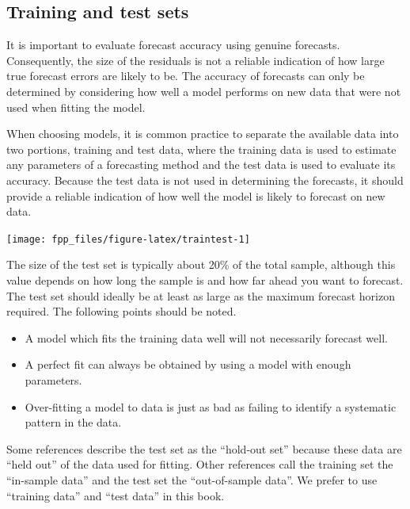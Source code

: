 \documentclass[]{book}
\providecommand{\tightlist}{%
  \setlength{\itemsep}{0pt}\setlength{\parskip}{0pt}}
\begin{document}
\hypertarget{training-and-test-sets}{%
\subsection*{Training and test sets}\label{training-and-test-sets}}

It is important to evaluate forecast accuracy using genuine forecasts. Consequently, the size of the residuals is not a reliable indication of how large true forecast errors are likely to be. The accuracy of forecasts can only be determined by considering how well a model performs on new data that were not used when fitting the model.

When choosing models, it is common practice to separate the available data into two portions, training and test data, where the training data is used to estimate any parameters of a forecasting method and the test data is used to evaluate its accuracy. Because the test data is not used in determining the forecasts, it should provide a reliable indication of how well the model is likely to forecast on new data.

\begin{center}\texttt{[image: fpp\_files/figure-latex/traintest-1]} \end{center}

The size of the test set is typically about 20\% of the total sample, although this value depends on how long the sample is and how far ahead you want to forecast. The test set should ideally be at least as large as the maximum forecast horizon required. The following points should be noted.

\begin{itemize}
\tightlist
\item
  A model which fits the training data well will not necessarily forecast well.
\item
  A perfect fit can always be obtained by using a model with enough parameters.
\item
  Over-fitting a model to data is just as bad as failing to identify a systematic pattern in the data.
\end{itemize}

Some references describe the test set as the ``hold-out set'' because these data are ``held out'' of the data used for fitting. Other references call the training set the ``in-sample data'' and the test set the ``out-of-sample data''. We prefer to use ``training data'' and ``test data'' in this book.
\end{document}
